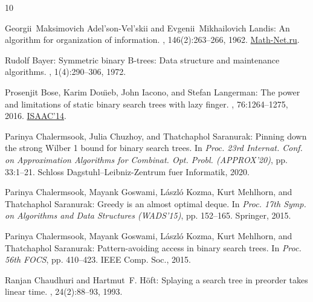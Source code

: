 \documentclass[11pt]{article}
\numberwithin{equation}{section}
\theoremstyle{definition}
\theoremstyle{plain}
\begin{document}
\tocrefpdfbookmark
\begin{thebibliography}{10}

{\sc Georgii~Maksimovich Adel'son-Vel'skii and Evgenii~Mikhailovich Landis}: An
  algorithm for organization of information.
, 146(2):263--266, 1962.
\newblock
  \href{https://www.mathnet.ru/php/archive.phtml?wshow=paper&jrnid=dan&paperid=26964&option_lang=eng}{Math-Net.ru}.

{\sc Rudolf Bayer}: Symmetric binary {B}-trees: {D}ata structure and
  maintenance algorithms.
, 1(4):290--306, 1972.
\newblock [\epfmtdoi{10.1007/BF00289509}]

{\sc Prosenjit Bose, Karim Dou{\"{\i}}eb, John Iacono, and Stefan Langerman}:
  The power and limitations of static binary search trees with lazy finger.
, 76:1264--1275, 2016.
\newblock \prelim
  \href{https://doi.org/10.1007/978-3-319-13075-0\_15}{ISAAC'14}.
\newblock [\epfmtdoi{10.1007/s00453-016-0224-x}]

{\sc Parinya Chalermsook, Julia Chuzhoy, and Thatchaphol Saranurak}: Pinning
  down the strong {W}ilber 1 bound for binary search trees.
\newblock In {\em Proc. 23rd Internat. Conf. on Approximation Algorithms for
  Combinat. Opt. Probl. (APPROX'20)}, pp. 33:1--21. Schloss
  Dagstuhl--Leibniz-Zentrum fuer Informatik, 2020.

{\sc Parinya Chalermsook, Mayank Goswami, L{\'a}szl{\'o} Kozma, Kurt Mehlhorn,
  and Thatchaphol Saranurak}: Greedy is an almost optimal deque.
\newblock In {\em Proc. 17th Symp. on Algorithms and Data Structures
  (WADS'15)}, pp. 152--165. Springer, 2015.
\newblock [\epfmtdoi{10.1007/978-3-319-21840-3\_13}]

{\sc Parinya Chalermsook, Mayank Goswami, L{\'{a}}szl{\'{o}} Kozma, Kurt
  Mehlhorn, and Thatchaphol Saranurak}: Pattern-avoiding access in binary
  search trees.
\newblock In {\em Proc. 56th FOCS}, pp. 410--423. IEEE Comp. Soc., 2015.

{\sc Ranjan Chaudhuri and Hartmut~F. H\"{o}ft}: Splaying a search tree in
  preorder takes linear time.
, 24(2):88--93, 1993.
\newblock [\epfmtdoi{10.1145/156063.156067}]


\end{thebibliography}
\end{document}
